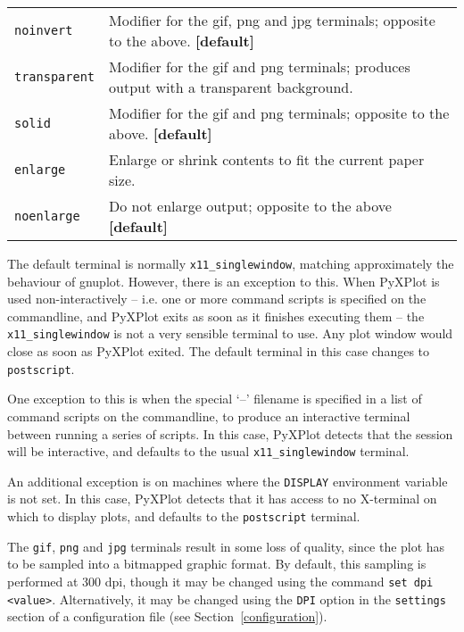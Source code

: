 \documentclass[a4paper,onecolumn,11pt]{book}
\begin{document}
\begin{longtable}{p{3cm}p{9cm}}
\texttt{noinvert} & Modifier for the gif, png and jpg terminals; opposite to the above. \textbf{[default]}\\
\texttt{transparent} & Modifier for the gif and png terminals; produces output with a transparent background.\index{transparent terminal}\index{gif output!transparency}\index{png output!transparency}\\
\texttt{solid} & Modifier for the gif and png terminals; opposite to the above. \textbf{[default]}\\
\texttt{enlarge} & Enlarge or shrink contents to fit the current paper
size.\index{enlarging output}\\
\texttt{noenlarge} & Do not enlarge output; opposite to the above \textbf{[default]}\\
\end{longtable}
\label{terminals}

The default terminal is normally \texttt{x11\_singlewindow}, matching
approximately the behaviour of gnuplot. However, there is an exception to this.
When PyXPlot is used non-interactively -- i.e. one or more command scripts is
specified on the commandline, and PyXPlot exits as soon as it finishes
executing them -- the \texttt{x11\_singlewindow} is not a very sensible
terminal to use. Any plot window would close as soon as PyXPlot exited. The
default terminal in this case changes to \texttt{postscript}.

One exception to this is when the special `--' filename is specified in a list
of command scripts on the commandline, to produce an interactive terminal
between running a series of scripts. In this case, PyXPlot detects that the
session will be interactive, and defaults to the usual
\texttt{x11\_singlewindow} terminal.

An additional exception is on machines where the \texttt{DISPLAY} environment
variable is not set. In this case, PyXPlot detects that it has access to no
X-terminal on which to display plots, and defaults to the \texttt{postscript}
terminal.

The \texttt{gif}, \texttt{png} and \texttt{jpg} terminals result in some loss
of quality, since the plot has to be sampled into a bitmapped graphic format.
By default, this sampling is performed at 300 dpi, though it may be changed
using the command \texttt{set dpi <value>}. Alternatively, it may be changed
using the \texttt{DPI} option in the \texttt{settings} section of a
configuration file (see Section~\ref{configuration}).
\end{document}
